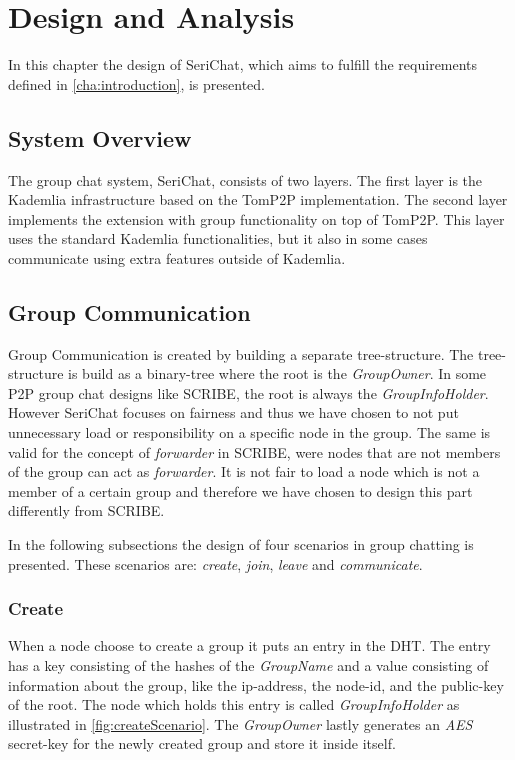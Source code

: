 \chapter{Design and Analysis} \label{cha:design}
In this chapter the design of SeriChat, which aims to fulfill the requirements defined in \autoref{cha:introduction}, is presented.

\section{System Overview}
The group chat system, SeriChat, consists of two layers. The first layer is the Kademlia infrastructure based on the TomP2P implementation. The second layer implements the extension with group functionality on top of TomP2P. This layer uses the standard Kademlia functionalities, but it also in some cases communicate using extra features outside of Kademlia. 

\section{Group Communication}
Group Communication is created by building a separate tree-structure. The tree-structure is build as a binary-tree where the root is the \emph{GroupOwner}. In some P2P group chat designs like SCRIBE, the root is always the \emph{GroupInfoHolder}. However SeriChat focuses on fairness and thus we have chosen to not put unnecessary load or responsibility on a specific node in the group. The same is valid for the concept of \emph{forwarder} in SCRIBE, were nodes that are not members of the group can act as \emph{forwarder}. It is not fair to load a node which is not a member of a certain group and therefore we have chosen to design this part differently from SCRIBE.

In the following subsections the design of four scenarios in group chatting is presented. These scenarios are: \emph{create}, \emph{join}, \emph{leave} and \emph{communicate}.

\subsection{Create}
When a node choose to create a group it puts an entry in the DHT. The entry has a key consisting of the hashes of the \emph{GroupName} and a value consisting of information about the group, like the ip-address, the node-id, and the public-key of the root. The node which holds this entry is called \emph{GroupInfoHolder} as illustrated in \autoref{fig:createScenario}. The \emph{GroupOwner} lastly generates an \emph{AES} secret-key for the newly created group and store it inside itself.

